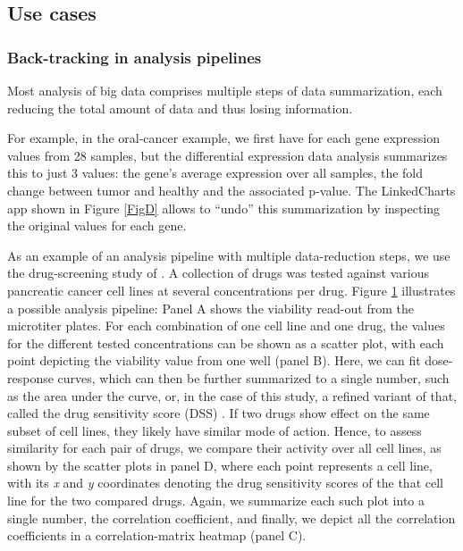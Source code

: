 \documentclass[twocolumn,10pt]{article}
\begin{document}
\begin{figure}
	\label{FigC}
\end{figure}



\subsection{Use cases}
\subsubsection{Back-tracking in analysis pipelines}

Most analysis of big data comprises multiple steps of data summarization, each reducing the total amount of data and thus losing information.

For example, in the oral-cancer example, we first have for each gene expression values from 28 samples, but the differential expression data analysis summarizes this to just 3 values: the gene's average expression over all samples, the fold change between tumor and healthy and the associated p-value. The LinkedCharts app shown in Figure \ref{FigD} allows to ``undo'' this summarization by inspecting the original values for each gene.

As an example of an analysis pipeline with multiple data-reduction steps, we use the drug-screening study of \citet{he_2018}. A collection of drugs was tested against various pancreatic cancer cell lines at several concentrations per drug. Figure \ref{FigC} illustrates a possible analysis pipeline: Panel A shows the viability read-out from the microtiter plates. For each combination of one cell line and one drug, the values for the different tested concentrations can be shown as a scatter plot, with each point depicting the viability value from one well (panel B). Here, we can fit dose-response curves, which can then be further summarized to a single number, such as the area under the curve, or, in the case of this study, a refined variant of that, called the drug sensitivity score (DSS) \citep{yadav_2014}. If two drugs show effect on the same subset of cell lines, they likely have similar mode of action. Hence, to assess similarity for each pair of drugs, we compare their activity over all cell lines, as shown by the scatter plots in panel D, where each point represents a cell line, with its \emph{x} and \emph{y} coordinates denoting the drug sensitivity scores of the that cell line for the two compared drugs. Again, we summarize each such plot into a single number, the correlation coefficient, and finally, we depict all the correlation coefficients in a correlation-matrix heatmap (panel C).
\end{document}
